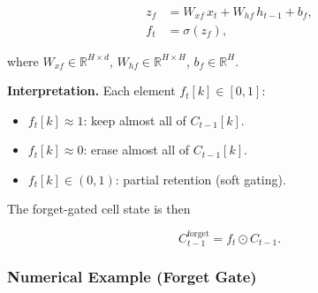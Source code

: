 \documentclass[12pt,a4paper]{article}
\newcommand{\R}{\mathbb{R}}
\begin{document}
\begin{align}
  z_f &= W_{xf}\, x_t + W_{hf}\, h_{t-1} + b_f, \label{eq:zf} \\
  f_t &= \sigma(z_f), \label{eq:ft}
\end{align}

where $W_{xf} \in \R^{H \times d}$, $W_{hf} \in \R^{H \times H}$,
$b_f \in \R^H$.

\textbf{Interpretation.}
Each element $f_t[k] \in [0,1]$:
\begin{itemize}
  \item $f_t[k] \approx 1$: keep almost all of $C_{t-1}[k]$.
  \item $f_t[k] \approx 0$: erase almost all of $C_{t-1}[k]$.
  \item $f_t[k] \in (0,1)$: partial retention (soft gating).
\end{itemize}

The forget-gated cell state is then

\begin{equation}
  C_{t-1}^{\text{forget}} = f_t \odot C_{t-1}.
  \label{eq:forget-applied}
\end{equation}

\subsubsection{Numerical Example (Forget Gate)}
\label{subsubsec:forget-numerical}
\end{document}
